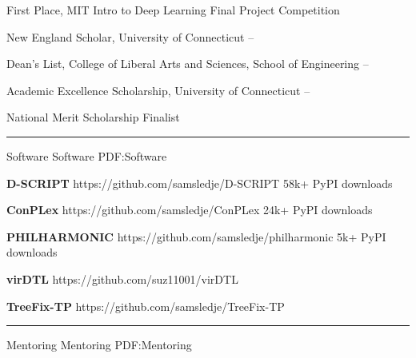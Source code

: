\documentclass[letterpaper,MMMyyyy,nonstopmode]{simpleresumecv}
\begin{document}
\begin{Body}
\Entry
{First Place, MIT Intro to Deep Learning Final Project Competition}
\hfill
{}
\Gap

\Entry
{New England Scholar, University of Connecticut}
\hfill
{} -- 
\Gap

\Entry
{Dean's List, College of Liberal Arts and Sciences, School of Engineering}
\hfill
{} --
\Gap

\Entry
{Academic Excellence Scholarship, University of Connecticut}
\hfill
{} -- 
\Gap




\Entry
{National Merit Scholarship Finalist}
\hfill
{}

\BigGap
\hrule
\Section
{Software}
{Software}
{PDF:Software}

\Entry
{\textbf{D-SCRIPT}}
\hfill https://github.com/samsledje/D-SCRIPT
\Gap
\Item
58k+ PyPI downloads
\BigGap

\Entry
{\textbf{ConPLex}}
\hfill https://github.com/samsledje/ConPLex
\Gap
\Item
24k+ PyPI downloads
\BigGap

\Entry
{\textbf{PHILHARMONIC}}
\hfill https://github.com/samsledje/philharmonic
\Gap
\Item
5k+ PyPI downloads
\BigGap

\Entry
{\textbf{virDTL}}
\hfill https://github.com/suz11001/virDTL
\BigGap

\Entry
{\textbf{TreeFix-TP}}
\hfill https://github.com/samsledje/TreeFix-TP
\BigGap



\BigGap
\hrule
\Section
{Mentoring}
{Mentoring}
{PDF:Mentoring}


\end{Body}
\end{document}
